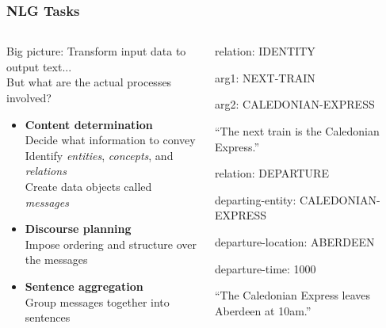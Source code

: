 \begin{frame}
\frametitle{NLG Tasks}

\begin{columns}
	
	\begin{column}{0.6\textwidth}
		Big picture: Transform input data to output text...\\
		But what are the actual processes involved?

		\vspace{12pt}
		
		\begin{itemize}
		
			\item \textbf{Content determination} \\
			      Decide what information to convey\\
			      Identify \textit{entities}, \textit{concepts},
			      and \textit{relations}\\
			      Create data objects called \textit{messages}
		
			\item \textbf{Discourse planning} \\
			      Impose ordering and structure over the messages
			
			\item \textbf{Sentence aggregation} \\
			      Group messages together into sentences
		
		\end{itemize}
	\end{column}
	
	\begin{column}{0.4\textwidth}
	\tiny
		\begin{tcolorbox}[title=message-id: msg01, width=0.85\textwidth]
			relation: IDENTITY
			
			arg1: NEXT-TRAIN
			
			arg2: CALEDONIAN-EXPRESS
		\end{tcolorbox}
		
		``The next train is the Caledonian Express.''
		
		\vspace{12pt}
		
		\begin{tcolorbox}[title=message-id: msg02, width=0.85\textwidth]
			relation: DEPARTURE
			
			departing-entity: CALEDONIAN-EXPRESS
			
			departure-location: ABERDEEN
			
			departure-time: 1000
		\end{tcolorbox}
		
		``The Caledonian Express leaves Aberdeen at 10am.''
	\end{column}

\end{columns}

\end{frame}
